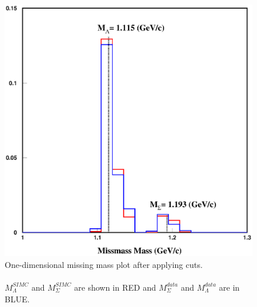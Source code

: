 
\begin{figure}[!tbp]
  \centering
  \includegraphics[width=0.8\columnwidth]{com_plot_missmass_2}
  \caption[One-dimensional missing mass plot after applying cuts.]{\label{fig:com_plot_missmass_2}One-dimensional missing mass plot after applying cuts.\\\\ $M_\Lambda^{SIMC}$ and $M_\Sigma^{SIMC}$ are shown in RED and $M_\Sigma^{data}$ and $M_\Lambda^{data}$ are in BLUE.}
\end{figure}

